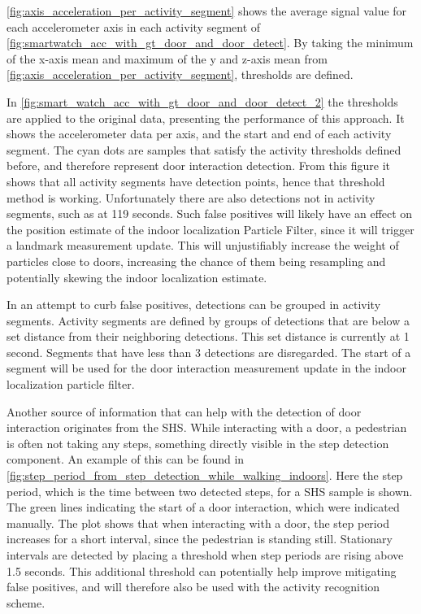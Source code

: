 \cref{fig:axis_acceleration_per_activity_segment} shows the average signal value for each accelerometer axis in each activity segment of \cref{fig:smartwatch_acc_with_gt_door_and_door_detect}. By taking the minimum of the x-axis mean and maximum of the y and z-axis mean from \cref{fig:axis_acceleration_per_activity_segment}, thresholds are defined.

In \cref{fig:smart_watch_acc_with_gt_door_and_door_detect_2} the thresholds are applied to the original data, presenting the performance of this approach. It shows the accelerometer data per axis, and the start and end of each activity segment. The cyan dots are samples that satisfy the activity thresholds defined before, and therefore represent door interaction detection. From this figure it shows that all activity segments have detection points, hence that threshold method is working. Unfortunately there are also detections not in activity segments, such as at 119 seconds. Such false positives will likely have an effect on the position estimate of the indoor localization Particle Filter, since it will trigger a landmark measurement update. This will unjustifiably increase the weight of particles close to doors, increasing the chance of them being resampling and potentially skewing the indoor localization estimate.  \par 

In an attempt to curb false positives, detections can be grouped in activity segments. Activity segments are defined by groups of detections that are below a set distance from their neighboring detections. This set distance is currently at 1 second. Segments that have less than 3 detections are disregarded. The start of a segment will be used for the door interaction measurement update in the indoor localization particle filter.\par

Another source of information that can help with the detection of door interaction originates from the \ac{SHS}. While interacting with a door, a pedestrian is often not taking any steps, something directly visible in the step detection component. An example of this can be found in \cref{fig:step_period_from_step_detection_while_walking_indoors}. Here the step period, which is the time between two detected steps, for a \ac{SHS} sample is shown. The green lines indicating the start of a door interaction, which were indicated manually. The plot shows that when interacting with a door, the step period increases for a short interval, since the pedestrian is standing still. Stationary intervals are detected by placing a threshold when step periods are rising above 1.5 seconds. This additional threshold can potentially help improve mitigating false positives, and will therefore also be used with the activity recognition scheme.

